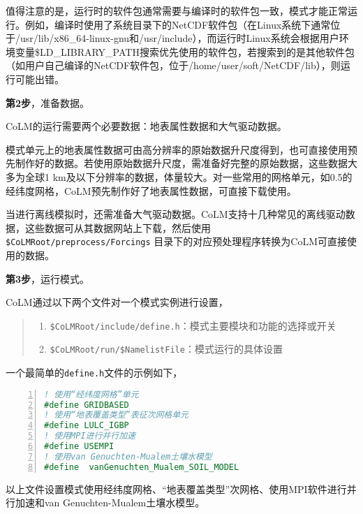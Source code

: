 值得注意的是，运行时的软件包通常需要与编译时的软件包一致，模式才能正常运行。例如，编译时使用了系统目录下的NetCDF软件包（在Linux系统下通常位于/usr/lib/x86\_64-linux-gnu和/usr/include），而运行时Linux系统会根据用户环境变量\$LD\_LIBRARY\_PATH搜索优先使用的软件包，若搜索到的是其他软件包（如用户自己编译的NetCDF软件包，位于/home/user/soft/NetCDF/lib），则运行可能出错。

\bigskip
\textbf{第2步}，准备数据。

CoLM的运行需要两个必要数据：地表属性数据和大气驱动数据。

模式单元上的地表属性数据可由高分辨率的原始数据升尺度得到，也可直接使用预先制作好的数据。若使用原始数据升尺度，需准备好完整的原始数据，这些数据大多为全球1 km及以下分辨率的数据，体量较大。对一些常用的网格单元，如0.5\textdegree 的经纬度网格，CoLM预先制作好了地表属性数据，可直接下载使用。

当进行离线模拟时，还需准备大气驱动数据。CoLM支持十几种常见的离线驱动数据，这些数据可从其数据网站上下载，然后使用 \texttt{\$CoLMRoot/preprocess/Forcings} 目录下的对应预处理程序转换为CoLM可直接使用的数据。

\bigskip
\textbf{第3步}，运行模式。

CoLM通过以下两个文件对一个模式实例进行设置，
\begin{quote}
\begin{enumerate}[label=\arabic*)]
    \item \texttt{\$CoLMRoot/include/define.h}：模式主要模块和功能的选择或开关
    \item \texttt{\$CoLMRoot/run/\$NamelistFile}：模式运行的具体设置
\end{enumerate}
\end{quote}

一个最简单的\texttt{define.h}文件的示例如下，
\begin{lstlisting}[language=fortran, basicstyle=\linespread{1.2}\footnotesize\fontspec{Courier New}, commentstyle=\color{black}, numbers=left, numberstyle=\tiny, xleftmargin=1.5em,xrightmargin=0em, aboveskip=1em]
! 使用“经纬度网格”单元
#define GRIDBASED
! 使用“地表覆盖类型”表征次网格单元
#define LULC_IGBP
! 使用MPI进行并行加速
#define USEMPI
! 使用van Genuchten-Mualem土壤水模型
#define  vanGenuchten_Mualem_SOIL_MODEL
\end{lstlisting}

以上文件设置模式使用经纬度网格、“地表覆盖类型”次网格、使用MPI软件进行并行加速和van Genuchten-Mualem土壤水模型。

